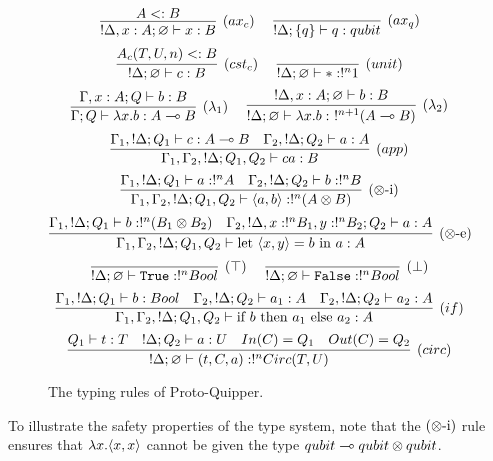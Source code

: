 \documentclass{article}
\begin{document}

\begin{figure}[!ht]
\begin{mdframed}
\[
\infer[(ax_c)]{!\Delta, x:A;\varnothing\entails x:B}{
  A<:B
}
~~~~
\infer[(ax_q)]{!\Delta;\s{q}\entails q:qubit}{
} 
\]
\[
\infer[(cst_c)]{!\Delta;\varnothing \entails c:B}{
  A_{c}(T,U,n)<:B
} 
~~~~
\infer[(unit)]{!\Delta;\varnothing\entails *:!^n 1}{
}
\]
\[
\infer[(\lambda_1)]{\Gamma;Q\entails \lambda x.b:A\loli B}{
  \Gamma,x:A;Q \entails b:B
}
~~~~
\infer[(\lambda_2)]{!\Delta;\varnothing \entails \lambda x.b:~!^{n+1}(A\loli B)}{
  !\Delta, x:A;\varnothing \entails b:B
}
\]
\[
\infer[(app)]{\Gamma_1,\Gamma_2, !\Delta;Q_1,Q_2\entails ca:B}{
  \Gamma_1, !\Delta;Q_1\entails c:A\loli B 
  &
  \Gamma_2, !\Delta ;Q_2\entails a:A 
}
\]
\[
\infer[(\x\mbox{-i})]{\Gamma_1,\Gamma_2, !\Delta;Q_1,Q_2\entails \p{a,b}:!^n(A\x B)}{
  \Gamma_1, !\Delta;Q_1\entails a:!^nA 
  &
  \Gamma_2, !\Delta ;Q_2\entails b:!^nB
}
\]
\[
\infer[(\x\mbox{-e})]{\Gamma_1,\Gamma_2, !\Delta;Q_1,Q_2\entails \letin{\p{x,y}}{b}{a}:A}{
  \Gamma_1, !\Delta;Q_1\entails b:!^n(B_1\x B_2) 
  &
  \Gamma_2, !\Delta, x:!^nB_1, y:!^nB_2 ;Q_2\entails a:A
}
\]
\[
\infer[(\top)]{!\Delta;\varnothing\entails \true:!^n Bool}{
} 
~~~~
\infer[(\bot)]{!\Delta;\varnothing\entails \false:!^n Bool}{
}
\]
\[
\infer[(if)]{\Gamma_1,\Gamma_2, !\Delta;Q_1,Q_2\entails \ifthenelse{b}{a_1}{a_2}:A}{
  \Gamma_1, !\Delta;Q_1\entails b:Bool 
  &
  \Gamma_2, !\Delta;Q_2 \entails a_1:A ~~~ \Gamma_2, !\Delta;Q_2 \entails a_2:A
}
\]
\[
\infer[(circ)]{!\Delta;\varnothing \entails (t,C,a):!^nCirc(T,U)}{
  Q_1\entails t:T 
  &
  !\Delta ; Q_2\entails a:U 
  &
  In(C)=Q_1 
  &
  Out(C)=Q_2
}
\]
\end{mdframed}
\caption{The typing rules of Proto-Quipper.}
\label{trules}
\end{figure}

To illustrate the safety properties of the type system, 
note that the $(\otimes\mbox{-i})$ rule ensures that 
$\lambda x. \langle x,x\rangle$ cannot be given the type 
$qubit\multimap qubit \otimes qubit$.
\end{document}
